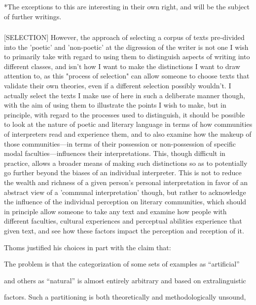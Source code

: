 \documentclass[]{article}
\begin{document}
*The exceptions to this are interesting in their own right, and will be the subject of further writings.



\subsubsection{}



[SELECTION] However, the approach of selecting a corpus of texts pre-divided into the 'poetic' and 'non-poetic' at the digression of the writer is not one I wish to primarily take with regard to using them to distinguish aspects of writing into different classes, and isn't how I want to make the distinctions I want to draw attention to, as this "process of selection" can allow someone to choose texts that validate their own theories, even if a different selection possibly wouldn't. I actually select the texts I make use of here in such a deliberate manner though, with the aim of using them to illustrate the points I wish to make, but in principle, with regard to the processes used to distinguish, it should be possible to look at the nature of poetic and literary language in terms of how communities of interpreters read and experience them, and to also examine how the makeup of those communities—in terms of their possession or non-possession of specific modal faculties—influences their interpretations. This, though difficult in practice, allows a broader means of making such distinctions so as to potentially go further beyond the biases of an individual interpreter. This is not to reduce the wealth and richness of a given person's personal interpretation in favor of an abstract view of a 'communal interpretation' though, but rather to acknowledge the influence of the individual perception on literary communities, which should in principle allow someone to take any text and examine how people with different faculties, cultural experiences and perceptual abilities experience that given text, and see how these factors impact the perception and reception of it.



Thoms justified his choices in part with the claim that:

The problem is that the categorization of some sets of examples as “artificial”

and others as “natural” is almost entirely arbitrary and based on extralinguistic

factors. Such a partitioning is both theoretically and methodologically unsound,
\end{document}
